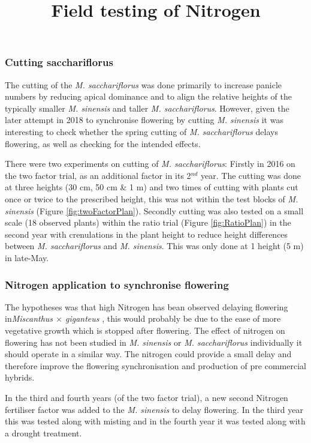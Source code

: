 \documentclass[fleqn, 15pt, lineno]{olplainarticle}
\begin{document}
\FloatBarrier
\subsubsection{Cutting sacchariflorus}
The cutting of the \textit{M. sacchariflorus} was done primarily to increase panicle numbers by reducing apical dominance and to align the relative heights of the typically smaller \textit{M. sinensis} and taller \textit{M. sacchariflorus}.
However, given the later attempt in 2018 to synchronise flowering by cutting \textit{M. sinensis} it was interesting to check whether the spring cutting of \textit{M. sacchariflorus} delays flowering, as well as checking for the intended effects.

There were two  experiments on cutting of \textit{M. sacchariflorus}: 
Firstly in 2016 on the two factor trial, as an additional factor in its 2$^{nd}$ year.
The cutting was done at three heights (30 cm, 50 cm \& 1 m) and two times of cutting with plants cut once or twice to the prescribed height, this was not within the test blocks of \textit{M. sinensis} (Figure \ref{fig:twoFactorPlan}). 
Secondly cutting was also tested on a small scale (18 observed plants) within the ratio trial (Figure \ref{fig:RatioPlan}) in the second year with crenulations in the plant height to reduce height differences between \textit{M. sacchariflorus} and \textit{M. sinensis}. 
This was only done at 1 height (5 m) in late-May.




\FloatBarrier
\subsubsection{Nitrogen application to synchronise flowering}
The hypotheses was that high Nitrogen has bean observed delaying flowering in\textit{Miscanthus $\times$ giganteus} \citep{HEATON2009}, this would probably be due to the ease of more vegetative growth which is stopped after flowering.
The effect of nitrogen on flowering has not been studied in \textit{M. sinensis} or \textit{M. sacchariflorus} individually it should operate in a similar way.
The nitrogen could provide a small delay and therefore improve the flowering synchronisation and production of  pre commercial hybrids.


\title{Field testing of Nitrogen}

In the third and fourth years  (of the two factor trial), a new second Nitrogen fertiliser factor was added to the \textit{M. sinensis} to delay flowering. In the third year this was tested along with misting and in the fourth year it was tested along with a drought treatment.
\end{document}
